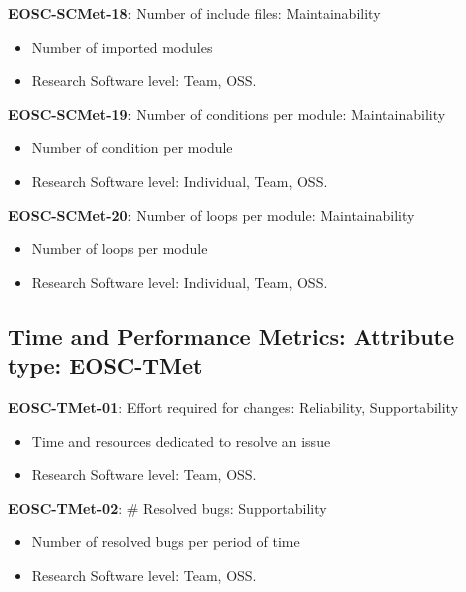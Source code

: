 \textbf{EOSC-SCMet-18}: Number of include files: Maintainability

\begin{itemize}
    \item Number of imported modules \cite{ogasawara_experiences_1996}
    \item Research Software level: Team, OSS.
\end{itemize}

\textbf{EOSC-SCMet-19}: Number of conditions per module: Maintainability

\begin{itemize}
    \item Number of condition per module \cite{ogasawara_experiences_1996}
    \item Research Software level: Individual, Team, OSS.
\end{itemize}

\textbf{EOSC-SCMet-20}: Number of loops per module: Maintainability

\begin{itemize}
    \item Number of loops per module \cite{ogasawara_experiences_1996}
    \item Research Software level: Individual, Team, OSS.
\end{itemize}

\subsection{Time and Performance Metrics: Attribute type: EOSC-TMet}

\textbf{EOSC-TMet-01}: Effort required for changes: Reliability, Supportability

\begin{itemize}
    \item Time and resources dedicated to resolve an issue \cite{montagud_systematic_2012}
    \item Research Software level: Team, OSS.
\end{itemize}

\textbf{EOSC-TMet-02}: \# Resolved bugs: Supportability

\begin{itemize}
    \item Number of resolved bugs per period of time \cite{montagud_systematic_2012}
    \item Research Software level: Team, OSS.
\end{itemize}

